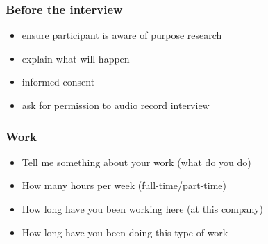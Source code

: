 \subsubsection{Before the interview}
\begin{itemize}
\item 
ensure participant is aware of purpose research 
\item 
explain what will happen
\item 
informed consent
\item 
ask for permission to audio record interview
\end{itemize}
\subsubsection{Work}
\begin{itemize}
\item Tell me something about your work (what do you do)
\item  How many hours per week (full-time/part-time)
\item How long have you been working here (at this company) \item How long have you been doing this type of work
\end{itemize}
